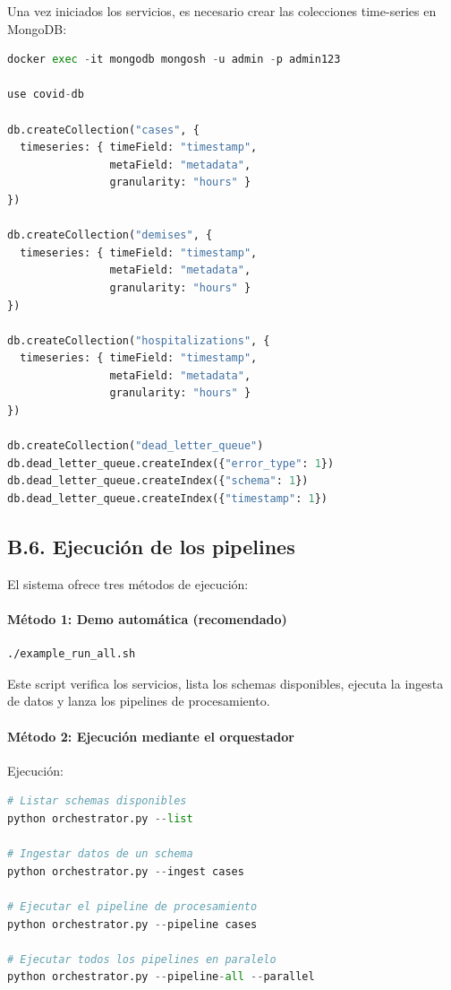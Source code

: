 \documentclass[12pt,a4paper]{article}
\begin{document}
Una vez iniciados los servicios, es necesario crear las colecciones time-series en MongoDB:

\begin{lstlisting}[language=Python, caption=mongo-db-collections]
docker exec -it mongodb mongosh -u admin -p admin123

use covid-db

db.createCollection("cases", {
  timeseries: { timeField: "timestamp",
                metaField: "metadata",
                granularity: "hours" }
})

db.createCollection("demises", {
  timeseries: { timeField: "timestamp",
                metaField: "metadata",
                granularity: "hours" }
})

db.createCollection("hospitalizations", {
  timeseries: { timeField: "timestamp",
                metaField: "metadata",
                granularity: "hours" }
})

db.createCollection("dead_letter_queue")
db.dead_letter_queue.createIndex({"error_type": 1})
db.dead_letter_queue.createIndex({"schema": 1})
db.dead_letter_queue.createIndex({"timestamp": 1})
\end{lstlisting}

\subsection*{B.6. Ejecución de los pipelines}

El sistema ofrece tres métodos de ejecución:

\paragraph{Método 1: Demo automática (recomendado)}

\begin{verbatim}
./example_run_all.sh
\end{verbatim}

Este script verifica los servicios, lista los schemas disponibles, ejecuta la ingesta de datos y lanza los pipelines de procesamiento.\\

\paragraph{Método 2: Ejecución mediante el orquestador}

Ejecución:\\

\begin{lstlisting}[language=Python, caption=ejecuciones]
# Listar schemas disponibles
python orchestrator.py --list

# Ingestar datos de un schema
python orchestrator.py --ingest cases

# Ejecutar el pipeline de procesamiento
python orchestrator.py --pipeline cases

# Ejecutar todos los pipelines en paralelo
python orchestrator.py --pipeline-all --parallel
\end{lstlisting}
\end{document}
